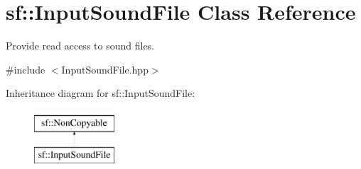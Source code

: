 \hypertarget{classsf_1_1_input_sound_file}{}\section{sf\+:\+:Input\+Sound\+File Class Reference}
\label{classsf_1_1_input_sound_file}


Provide read access to sound files.  




{\ttfamily \#include $<$Input\+Sound\+File.\+hpp$>$}

Inheritance diagram for sf\+:\+:Input\+Sound\+File\+:\begin{figure}[H]
\begin{center}
\leavevmode
\includegraphics[height=2.000000cm]{classsf_1_1_input_sound_file}
\end{center}
\end{figure}
